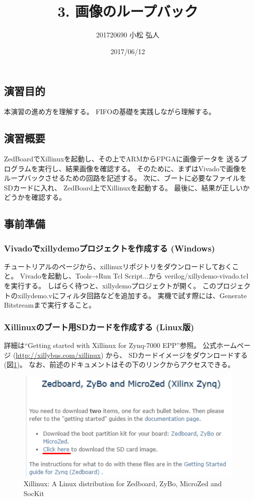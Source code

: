 \documentclass[11pt]{jsarticle}
\title{3. 画像のループバック}
\author{201720690 小松 弘人}
\date{2017/06/12}
\begin{document}
\maketitle
\subsection*{演習目的}
本演習の進め方を理解する。
FIFOの基礎を実践しながら理解する。

\subsection*{演習概要}
ZedBoardでXillinuxを起動し、その上でARMからFPGAに画像データを
送るプログラムを実行し、結果画像を確認する。
そのために、まずはVivadoで画像をループバックさせるための回路を記述する。
次に、ブートに必要なファイルをSDカードに入れ、
ZedBoard上でXillinuxを起動する。
最後に、結果が正しいかどうかを確認する。

\subsection*{事前準備}
\subsubsection*{Vivadoでxillydemoプロジェクトを作成する (Windows)}
チュートリアルのページから、xillinuxリポジトリをダウンロードしておくこと。
Vivadoを起動し、Tools→Run Tcl Script...から
verilog/xillydemo-vivado.tclを実行する。
しばらく待つと、xillydemoプロジェクトが開く。
このプロジェクトのxillydemo.vにフィルタ回路などを追加する。
実機で試す際には、Generate Bitstreamまで実行すること。

\subsubsection*{Xillinuxのブート用SDカードを作成する (Linux版)}
詳細は``Getting started with Xillinux for Zynq-7000 EPP''参照。
公式ホームページ (\url{http://xillybus.com/xillinux}) から、
SDカードイメージをダウンロードする (図\ref{img:xillinux})。
なお、前述のドキュメントはその下のリンクからアクセスできる。

\begin{figure}[ht]
	\centering
	\includegraphics[width=0.5\linewidth]{../img/xillinux.PNG}
	\caption{Xillinux: A Linux distribution for Zedboard, ZyBo, MicroZed and SocKit}
	\label{img:xillinux}
\end{figure}
\end{document}

